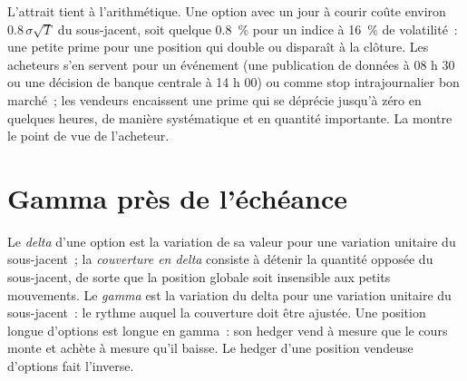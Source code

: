 L'attrait tient à l'arithmétique. Une option  avec un jour à courir coûte
environ $0.8\,\sigma\sqrt{T}$ du sous-jacent, soit quelque 0.8~\% pour un indice à 16~\% de
volatilité~: une petite prime pour une position qui double ou disparaît à la
clôture. Les acheteurs s'en servent pour un événement (une publication de données à 08 h 30
ou une décision de banque centrale à 14 h 00) ou comme stop intrajournalier bon marché~; les vendeurs encaissent une prime qui
se déprécie jusqu'à zéro en quelques heures, de manière systématique et en quantité importante.
La  montre le point de vue de l'acheteur.

\begin{omfigure}

\label{fig:m1:zero-day-options-and-retail-flow:straddle}
\end{omfigure}

\section{Gamma près de l'échéance}

\begin{definition}\label{def:m1:zero-day-options-and-retail-flow:gamma}
Le \emph{delta} d'une option est la variation de sa valeur pour une variation unitaire
du sous-jacent~; la \emph{couverture en delta} consiste à détenir la
quantité opposée du sous-jacent, de sorte que la position globale soit
insensible aux petits mouvements. Le \emph{gamma} est la variation du delta
pour une variation unitaire du sous-jacent~: le rythme auquel la couverture doit être
ajustée. Une position longue d'options est longue en gamma~: son hedger vend à mesure que
le cours monte et achète à mesure qu'il baisse. Le hedger d'une position vendeuse d'options fait
l'inverse.
\end{definition}

